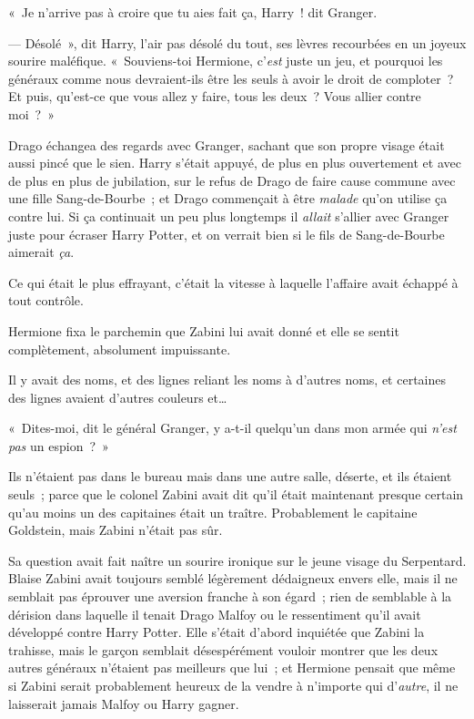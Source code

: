 «~Je n'arrive pas à croire que tu aies fait ça, Harry~! dit Granger.

--- Désolé~», dit Harry, l'air pas désolé du tout, ses lèvres recourbées en un joyeux sourire maléfique. «~Souviens-toi Hermione, c'\emph{est} juste un jeu, et pourquoi les généraux comme nous devraient-ils être les seuls à avoir le droit de comploter~? Et puis, qu'est-ce que vous allez y faire, tous les deux~? Vous allier contre moi~?~»

Drago échangea des regards avec Granger, sachant que son propre visage était aussi pincé que le sien. Harry s'était appuyé, de plus en plus ouvertement et avec de plus en plus de jubilation, sur le refus de Drago de faire cause commune avec une fille Sang-de-Bourbe~; et Drago commençait à être \emph{malade} qu'on utilise ça contre lui. Si ça continuait un peu plus longtemps il \emph{allait} s'allier avec Granger juste pour écraser Harry Potter, et on verrait bien si le fils de Sang-de-Bourbe aimerait \emph{ça}.

\later

Ce qui était le plus effrayant, c'était la vitesse à laquelle l'affaire avait échappé à tout contrôle.

Hermione fixa le parchemin que Zabini lui avait donné et elle se sentit complètement, absolument impuissante.

Il y avait des noms, et des lignes reliant les noms à d'autres noms, et certaines des lignes avaient d'autres couleurs et…

«~Dites-moi, dit le général Granger, y a-t-il quelqu'un dans mon armée qui \emph{n'est pas} un espion~?~»

Ils n'étaient pas dans le bureau mais dans une autre salle, déserte, et ils étaient seuls~; parce que le colonel Zabini avait dit qu'il était maintenant presque certain qu'au moins un des capitaines était un traître. Probablement le capitaine Goldstein, mais Zabini n'était pas sûr.

Sa question avait fait naître un sourire ironique sur le jeune visage du Serpentard. Blaise Zabini avait toujours semblé légèrement dédaigneux envers elle, mais il ne semblait pas éprouver une aversion franche à son égard~; rien de semblable à la dérision dans laquelle il tenait Drago Malfoy ou le ressentiment qu'il avait développé contre Harry Potter. Elle s'était d'abord inquiétée que Zabini la trahisse, mais le garçon semblait désespérément vouloir montrer que les deux autres généraux n'étaient pas meilleurs que lui~; et Hermione pensait que même si Zabini serait probablement heureux de la vendre à n'importe qui d'\emph{autre}, il ne laisserait jamais Malfoy ou Harry gagner.

